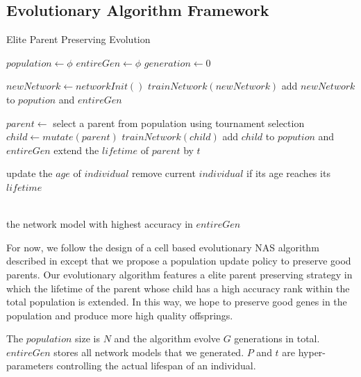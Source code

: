 \documentclass[conference]{IEEEtran}
\begin{document}
  \subsection{Evolutionary Algorithm Framework}
  
  \begin{algorithm}[H]  
    \caption{ Elite Parent Preserving Evolution}
    \begin{algorithmic}[1]  
  
    \State $population\gets \phi$
    \State $entireGen\gets \phi$
    \State $generation\gets 0$
    
    \State $newNetwork\gets networkInit()$
    \State $trainNetwork(newNetwork)$
    \State add $newNetwork$ to $popution$ and $entireGen$
    \EndWhile
    
  
    
      \State $parent\gets$ select a parent from population using tournament selection 
      \State $child \gets mutate(parent)$
      \State $trainNetwork(child)$
      \State add $child$ to $popution$ and $entireGen$
        \State extend the $lifetime$ of $parent$ by $t$
      \EndIf
      
        \State update the $age$ of $individual$
        \State remove current $individual$ if its age reaches its $lifetime$
      \EndFor
      
      
    \EndWhile
    
    
    \\  
    \Return the network model with highest accuracy in $entireGen$
 
  \end{algorithmic}  
  \end{algorithm}  
  For now, we follow the design of a cell based evolutionary NAS algorithm described in\cite{DBLP:journals/corr/abs-1802-01548} except that we propose a population update policy to preserve good parents. 
  Our evolutionary algorithm features a elite parent preserving strategy in which the lifetime of the parent whose child has a high accuracy rank within the total population is extended. In this way, we hope to preserve good genes in the population and produce more high quality offsprings.

The $population$ size is $N$ and the algorithm evolve $G$ generations in total. $entireGen$ stores all network models that we generated. $P$ and $t$ are hyper-parameters controlling the actual lifespan of an individual.
     
\end{document}
